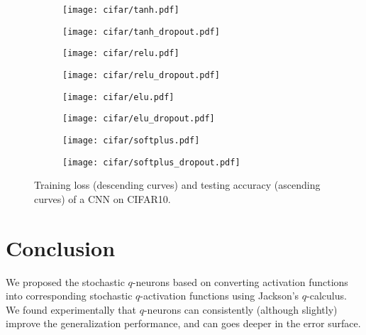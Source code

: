 \documentclass{article}
\newlength{\myfigwidth}
\begin{document}
\begin{figure*}%
\centering
\begin{subfigure}[b]{\myfigwidth}
\texttt{[image: cifar/tanh.pdf]}
\end{subfigure}
\begin{subfigure}[b]{\myfigwidth}
\texttt{[image: cifar/tanh\_dropout.pdf]}
\end{subfigure}
\begin{subfigure}[b]{\myfigwidth}
\texttt{[image: cifar/relu.pdf]}
\end{subfigure}
\begin{subfigure}[b]{\myfigwidth}
\texttt{[image: cifar/relu\_dropout.pdf]}
\end{subfigure}
\begin{subfigure}[b]{\myfigwidth}
\texttt{[image: cifar/elu.pdf]}
\end{subfigure}
\begin{subfigure}[b]{\myfigwidth}
\texttt{[image: cifar/elu\_dropout.pdf]}
\end{subfigure}
\begin{subfigure}[b]{\myfigwidth}
\texttt{[image: cifar/softplus.pdf]}
\end{subfigure}
\begin{subfigure}[b]{\myfigwidth}
\texttt{[image: cifar/softplus\_dropout.pdf]}
\end{subfigure}
\caption{Training loss (descending curves) and testing accuracy (ascending curves) of a CNN on CIFAR10.}\label{fig:cifarcnn}
\end{figure*}

\section{Conclusion}
We proposed the stochastic $q$-neurons based on converting activation functions into corresponding stochastic $q$-activation functions using Jackson's $q$-calculus.
We found experimentally that $q$-neurons can consistently (although slightly) improve the
generalization performance, and can goes deeper in the error surface.


%
%
\end{document}
